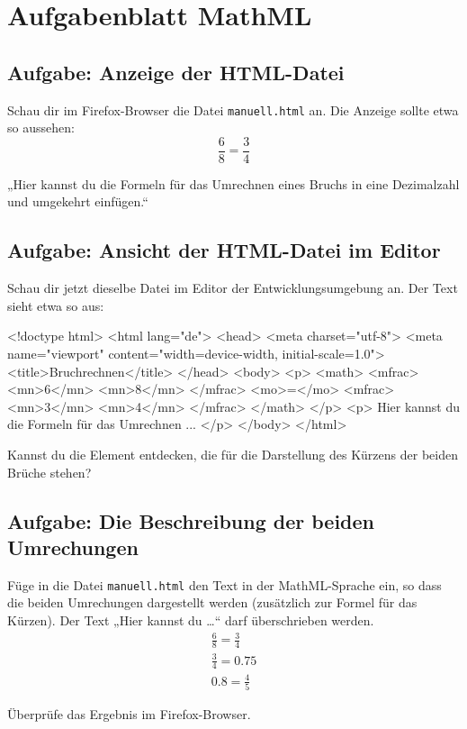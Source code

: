 \section{Aufgabenblatt MathML}

\subsection{Aufgabe: Anzeige der HTML-Datei}

Schau dir im Firefox-Browser die Datei \texttt{manuell.html} an. Die Anzeige sollte etwa so aussehen:
\[
\frac{6}{8} = \frac{3}{4}
\]

„Hier kannst du die Formeln für das Umrechnen eines Bruchs in eine Dezimalzahl und umgekehrt einfügen.“

\subsection{Aufgabe: Ansicht der HTML-Datei im Editor}

Schau dir jetzt dieselbe Datei im Editor der Entwicklungsumgebung an. Der Text sieht etwa so aus:

\begin{codeHTML}
<!doctype html>
<html lang="de">
	<head>
		<meta charset="utf-8">
		<meta name="viewport" content="width=device-width, initial-scale=1.0">
		<title>Bruchrechnen</title>
	</head>
	<body>
		<p>
			<math>
				<mfrac>
					<mn>6</mn>
					<mn>8</mn>
				</mfrac>
				<mo>=</mo>
				<mfrac>
					<mn>3</mn>
					<mn>4</mn>
				</mfrac>
			</math>
		</p>
		<p>
 			Hier kannst du die Formeln für das Umrechnen ...
		</p>
	</body>
</html>
\end{codeHTML}

Kannst du die Element entdecken, die für die Darstellung des Kürzens der beiden Brüche stehen?

\subsection{Aufgabe: Die Beschreibung der beiden Umrechungen}

Füge in die Datei \texttt{manuell.html} den Text in der MathML-Sprache ein, so dass die beiden Umrechungen dargestellt werden (zusätzlich zur Formel für das Kürzen). Der Text „Hier kannst du \dots“ darf überschrieben werden.
\begin{align*}
& \frac{6}{8} = \frac{3}{4} & \\[2ex]
& \frac{3}{4} = 0.75 & \\[2ex]
& 0.8 = \frac{4}{5} & 
\end{align*}

Überprüfe das Ergebnis im Firefox-Browser.